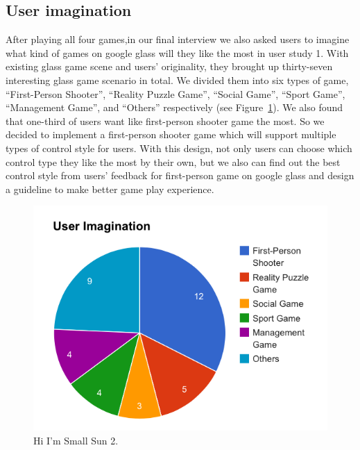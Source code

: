 \subsection{User imagination}
After playing all four games,in our final interview we also asked users to imagine what kind of games on google glass will they like the most in user study 1. With existing glass game scene and users' originality, they brought up thirty-seven interesting glass game scenario in total. We divided them into six types of game, ``First-Person Shooter'', ``Reality Puzzle Game'', ``Social Game'', ``Sport Game'', ``Management Game'', and ``Others'' respectively (see Figure~\ref{fig:US1_TypesOfGame}). We also found that one-third of users want like first-person shooter game the most. So we decided to implement a first-person shooter game which will support multiple types of control style for users. With this design, not only users can choose which control type they like the most by their own, but we also can find out the best control style from users' feedback for first-person game on google glass and design a guideline to make better game play experience.

\begin{figure}[!t]
\centering
\includegraphics[width=0.9\columnwidth]{Figures/US1_userImaginationStatistics.png}
\caption{Hi I'm Small Sun 2.}
\label{fig:US1_TypesOfGame}
\end{figure}
